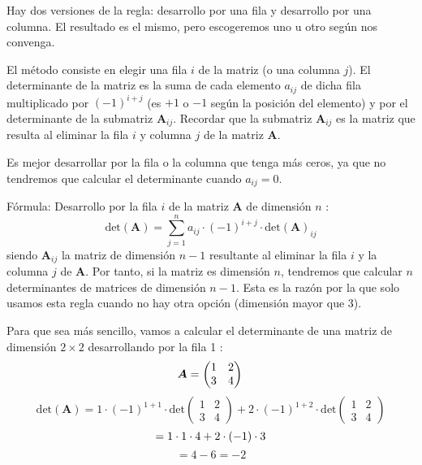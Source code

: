 Hay dos versiones de la regla: desarrollo por una fila y desarrollo por una columna. El resultado es el mismo, pero escogeremos uno u otro según nos convenga.

El método  consiste en elegir una fila $i$ de la matriz (o una columna $j$).
El determinante de la matriz es la suma de cada elemento $a_{ij}$ de dicha fila multiplicado por $(-1)^{i+j}$ (es $+1$ o $-1$ según la posición del elemento) y por el determinante de la submatriz $\boldsymbol{A}_{ij}$.
Recordar que la submatriz $\boldsymbol{A}_{ij}$ es la matriz que resulta al eliminar la fila $i$ y columna $j$ de la matriz $\boldsymbol{A}$.
\begin{remark}
  Es mejor desarrollar por la fila o la columna que tenga más ceros, ya que no tendremos que calcular el determinante cuando $a_{ij} = 0$.  
\end{remark}

Fórmula: Desarrollo por la fila $i$ de la matriz $\boldsymbol{A}$ de dimensión $n$ :
$$
\text{det}(\boldsymbol{A})=\sum_{j=1}^n a_{i j} \cdot(-1)^{i+j} \cdot \text{det}(\boldsymbol{A})_{i j}
$$
siendo $\boldsymbol{A}_{i j}$ la matriz de dimensión $n-1$ resultante al eliminar la fila $i$ y la columna $j$ de $\boldsymbol{A}$.
Por tanto, si la matriz es dimensión $n$, tendremos que calcular $n$ determinantes de matrices de dimensión $n-1$. Esta es la razón por la que solo usamos esta regla cuando no hay otra opción (dimensión mayor que 3).



\begin{example}
Para que sea más sencillo, vamos a calcular el determinante de una matriz de dimensión $2 \times 2$ desarrollando por la fila 1 :
\[
 \boldsymbol{A}=\begin{pmatrix}
1 & 2 \\
3 & 4
\end{pmatrix}\\\]
\[
\text{det}(\boldsymbol{A}) =1 \cdot(-1)^{1+1} \cdot\text{det}\begin{pmatrix}   
1 & 2 \\
3 & 4
 \end{pmatrix} 
 +2 \cdot(-1)^{1+2} \cdot \text{det}\begin{pmatrix}
1 & 2 \\
3 & 4
\end{pmatrix} \]\[
 =1 \cdot 1 \cdot4
+2 \cdot(-1) \cdot 3\\\]\[
 =4-6=-2\]
\end{example}

